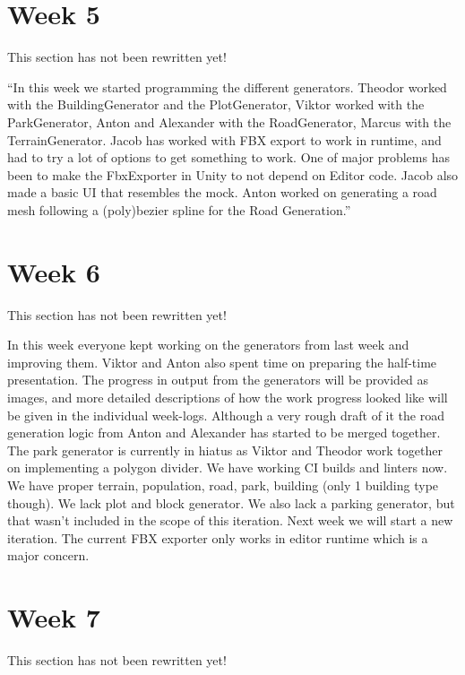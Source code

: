 \documentclass[11pt]{article}
\begin{document}
\section*{Week 5}
\label{sec:orgb91b0a9}
\begin{notice-warning}
This section has not been rewritten yet!
\end{notice-warning}

``In this week we started programming the different generators. Theodor worked with the BuildingGenerator and the PlotGenerator, Viktor worked with the ParkGenerator, Anton and Alexander with the RoadGenerator, Marcus with the TerrainGenerator.
Jacob has worked with FBX export to work in runtime, and had to try a lot of
options to get something to work. One of major problems has been to make the
FbxExporter in Unity to not depend on Editor code. Jacob also made a basic UI
that resembles the mock. Anton worked on generating a road mesh following a
(poly)bezier spline for the Road Generation.''

\section*{Week 6}
\label{sec:orga1833a1}
\begin{notice-warning}
This section has not been rewritten yet!
\end{notice-warning}

In this week everyone kept working on the generators from last week and
improving them. Viktor and Anton also spent time on preparing the half-time
presentation.  The progress in output from the generators will be provided as
images, and more detailed descriptions of how the work progress looked like will
be given in the individual week-logs. Although a very rough draft of it the road
generation logic from Anton and Alexander has started to be merged together. The
park generator is currently in hiatus as Viktor and Theodor work together on
implementing a polygon divider. We have working CI builds and linters now. We
have proper terrain, population, road, park, building (only 1 building type
though). We lack plot and block generator. We also lack a parking generator, but
that wasn't included in the scope of this iteration. Next week we will start a
new iteration. The current FBX exporter only works in editor runtime which is a
major concern.

\section*{Week 7}
\label{sec:org7878c6c}
\begin{notice-warning}
This section has not been rewritten yet!
\end{notice-warning}
\end{document}

